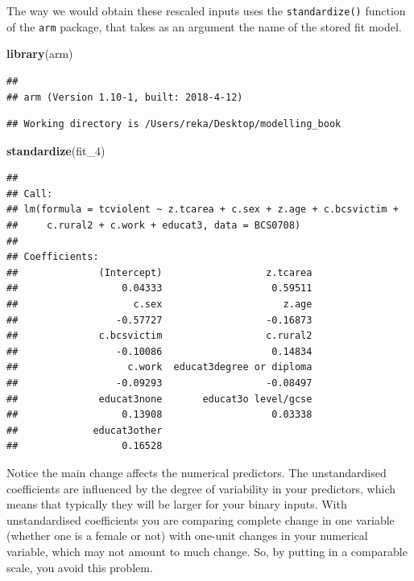 \documentclass[]{book}
\newenvironment{Shaded}{\begin{snugshade}}{\end{snugshade}}
\newcommand{\DecValTok}[1]{\textcolor[rgb]{0.00,0.00,0.81}{#1}}
\newcommand{\KeywordTok}[1]{\textcolor[rgb]{0.13,0.29,0.53}{\textbf{#1}}}
\newcommand{\NormalTok}[1]{#1}
\theoremstyle{definition}
\theoremstyle{definition}
\theoremstyle{definition}
\theoremstyle{remark}
\begin{document}
The way we would obtain these rescaled inputs uses the
\texttt{standardize()} function of the \texttt{arm} package, that takes
as an argument the name of the stored fit model.

\begin{Shaded}
\begin{Highlighting}[]
\KeywordTok{library}\NormalTok{(arm)}
\end{Highlighting}
\end{Shaded}

\begin{verbatim}
## 
## arm (Version 1.10-1, built: 2018-4-12)
\end{verbatim}

\begin{verbatim}
## Working directory is /Users/reka/Desktop/modelling_book
\end{verbatim}

\begin{Shaded}
\begin{Highlighting}[]
\KeywordTok{standardize}\NormalTok{(fit_}\DecValTok{4}\NormalTok{)}
\end{Highlighting}
\end{Shaded}

\begin{verbatim}
## 
## Call:
## lm(formula = tcviolent ~ z.tcarea + c.sex + z.age + c.bcsvictim + 
##     c.rural2 + c.work + educat3, data = BCS0708)
## 
## Coefficients:
##              (Intercept)                  z.tcarea  
##                  0.04333                   0.59511  
##                    c.sex                     z.age  
##                 -0.57727                  -0.16873  
##              c.bcsvictim                  c.rural2  
##                 -0.10086                   0.14834  
##                   c.work  educat3degree or diploma  
##                 -0.09293                  -0.08497  
##              educat3none       educat3o level/gcse  
##                  0.13908                   0.03338  
##             educat3other  
##                  0.16528
\end{verbatim}

Notice the main change affects the numerical predictors. The
unstandardised coefficients are influenced by the degree of variability
in your predictors, which means that typically they will be larger for
your binary inputs. With unstandardised coefficients you are comparing
complete change in one variable (whether one is a female or not) with
one-unit changes in your numerical variable, which may not amount to
much change. So, by putting in a comparable scale, you avoid this
problem.
\end{document}
